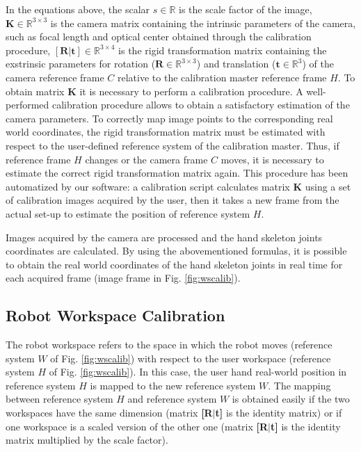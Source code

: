 \documentclass[a4paper, 10 pt, conference]{ieeeconf}      %
\begin{document}
In the equations above, the scalar $s\in\mathbb{R}$ is the scale factor of the image, $\mathbf{K}\in\mathbb{R}^{3\times3}$ is the camera matrix containing the intrinsic parameters of the camera, such as focal length and optical center obtained through the calibration procedure, $\mathbf{[R|t]}\in\mathbb{R}^{3\times4}$ is the rigid transformation matrix containing the exstrinsic parameters for rotation ($\mathbf{R}\in\mathbb{R}^{3\times3}$) and translation ($\mathbf{t}\in\mathbb{R}^3$) of the camera reference frame $C$ relative to the calibration master reference frame $H$. 
To obtain matrix \textbf{K} it is necessary to perform a calibration procedure. A well-performed calibration procedure allows to obtain a satisfactory estimation of the camera parameters. To correctly map image points to the corresponding real world coordinates, the rigid transformation matrix must be estimated with respect to the user-defined reference system of the calibration master. Thus, if reference frame $H$ changes or the camera frame $C$ moves, it is necessary to estimate the correct rigid transformation matrix again. This procedure has been automatized by our software: a calibration script calculates matrix \textbf{K} using a set of calibration images acquired by the user, then it takes a new frame from the actual set-up to estimate the position of reference system $H$.

Images acquired by the camera are processed and the hand skeleton joints coordinates are calculated. By using the abovementioned formulas, it is possible to obtain the real world coordinates of the hand skeleton joints in real time for each acquired frame (image frame in Fig. \ref{fig:wscalib}).

\subsection{Robot Workspace Calibration}

The robot workspace refers to the space in which the robot moves (reference system $W$ of Fig. \ref{fig:wscalib}) with respect to the user workspace (reference system $H$ of Fig. \ref{fig:wscalib}). In this case, the user hand real-world position in reference system $H$ is mapped to the new reference system $W$. The mapping between reference system $H$ and reference system $W$ is obtained easily if the two workspaces have the same dimension (matrix \textbf{[R$|$t]} is the identity matrix) or if one workspace is a scaled version of the other one (matrix \textbf{[R$|$t]} is the identity matrix multiplied by the scale factor). %
\end{document}
